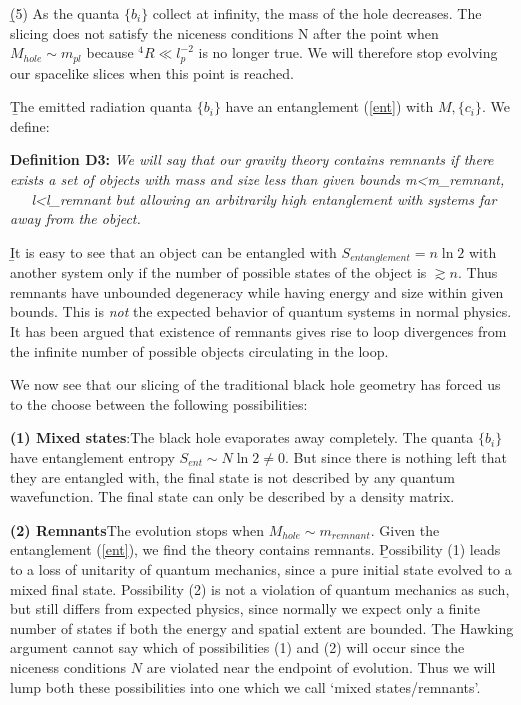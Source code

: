 \documentclass[12pt]{article}
\begin{document}
\b

(5) As the quanta $\{ b_i\}$ collect at infinity, the mass of the hole decreases. The slicing does not satisfy the niceness conditions N after the point when
$
M_{hole}\sim m_{pl}
$
because ${}^4R\ll l_p^{-2}$ is no longer true. We will therefore stop evolving our spacelike slices when this point is reached.

\b

The emitted radiation quanta $\{b_i\}$ have an entanglement (\ref{ent}) with $M, \{ c_i\}$. We define:

\b

{\bf Definition D3:} {\it We will say that our gravity theory contains {\it remnants} if there exists a set of  objects with mass and size less than given bounds 
\be
m<m_{remnant}, ~~~l<l_{remnant}
\ee
but allowing an arbitrarily high entanglement with systems far away from the object.}

\b

It is easy to see that an object can be entangled with $S_{entanglement}=n\ln 2$ with another system only if the number of possible states of the object is $\gtrsim n$. Thus remnants have unbounded degeneracy while having energy and size within given bounds. This is {\it not} the expected behavior of quantum systems in normal physics. It has been argued that existence of remnants gives rise to loop divergences from the infinite number of possible objects circulating in the loop. 

We now see that our slicing of the traditional black hole geometry has forced us to the choose between the following possibilities:

\b


{\bf (1) Mixed states}:\quad  The black hole evaporates away completely. The quanta $\{ b_i\}$ have entanglement entropy
$
S_{ent}\sim N\ln 2\ne 0
\label{enentropy}
$.
But since there is nothing left that they are entangled with, the final state is not described by any quantum wavefunction. The final state can only be described  by a density matrix.


\b

{\bf (2) Remnants}\quad  The evolution stops when $M_{hole}\sim m_{remnant}$. Given the entanglement (\ref{ent}), we find the theory contains remnants.
\b

Possibility (1) leads to a loss of unitarity of quantum mechanics, since a pure initial state evolved to a mixed final state. Possibility (2) is not a violation of quantum mechanics as such, but still differs from expected physics, since normally we expect only a finite number of states if both the energy and spatial extent are bounded.   The Hawking argument cannot say which of possibilities (1) and (2) will occur since the niceness conditions $N$ are violated near the endpoint of evolution. Thus we will lump both these possibilities into one which we call `mixed states/remnants'.
\end{document}
